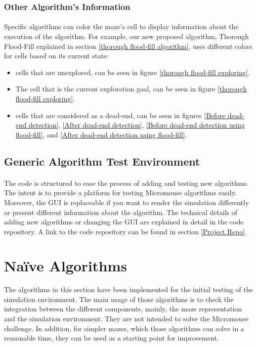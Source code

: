 \documentclass[12pt]{article}
\begin{document}
\subsubsection{Other Algorithm's Information}
\paragraph{}
Specific algorithms can color the \gls{maze}'s \gls{cell} to display information about the execution of the algorithm.
For example, our new proposed algorithm, Thorough Flood-Fill explained in section \ref{thorough flood-fill algorithm}, uses different colors for \gls{cell}s based on its current state:
\begin{itemize}
    \item \Gls{cell}s that are unexplored, can be seen in figure \ref{thorough flood-fill exploring}.
    \item The \gls{cell} that is the current exploration goal, can be seen in figure \ref{thorough flood-fill exploring}.
    \item \Gls{cell}s that are considered as a dead-end, can be seen in figures \ref{Before dead-end detection}, \ref{After dead-end detection}, \ref{Before dead-end detection using flood-fill}, and \ref{After dead-end detection using flood-fill}.
\end{itemize}

\subsection{Generic Algorithm Test Environment}
\paragraph{}
The code is structured to ease the process of adding and testing new algorithms.
The intent is to provide a platform for testing \gls{Micromouse} algorithms easily.
Moreover, the GUI is replaceable if you want to render the simulation differently or present different information about the algorithm.
The technical details of adding new algorithms or changing the GUI are explained in detail in the code repository.
A link to the code repository can be found in section \ref{Project Repo}.

\section{Na\"{i}ve Algorithms} \label{naive-algorithms}
\paragraph{}
The algorithms in this section have been implemented for the initial testing of the simulation environment. The main usage of those algorithms is to check the integration between the different components, mainly, the \gls{maze} representation and the simulation environment. They are not intended to solve the \gls{Micromouse} challenge. In addition, for simpler \gls{maze}s, which those algorithms can solve in a reasonable time, they can be used as a starting point for improvement.
\end{document}
